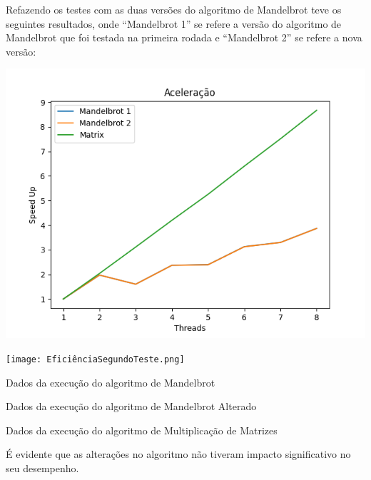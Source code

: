 \documentclass[10pt,a4paper]{article}
\begin{document}
		Refazendo os testes com as duas versões do algoritmo de Mandelbrot teve os seguintes resultados, onde ``Mandelbrot 1'' se refere
		a versão do algoritmo de Mandelbrot que foi testada na primeira rodada e ``Mandelbrot 2'' se refere a nova versão:

		\includegraphics[scale=.7]{SpeedUpSegundoTeste.png}
		
		\texttt{[image: EficiênciaSegundoTeste.png]}

		\clearpage

		\begin{table}[htb]
			\begin{adjustwidth}{-1cm}{}
				\caption{Dados da execução do algoritmo de Mandelbrot}
			\end{adjustwidth}
		\end{table}
		\begin{table}[htb]
			\begin{adjustwidth}{-1cm}{}
				\caption{Dados da execução do algoritmo de Mandelbrot Alterado}
			\end{adjustwidth}
		\end{table}
		\begin{table}[htb]
			\begin{adjustwidth}{-1cm}{}
				\caption{Dados da execução do algoritmo de Multiplicação de Matrizes}
			\end{adjustwidth}
		\end{table}

		É evidente que as alterações no algoritmo não tiveram impacto significativo no seu desempenho.
\end{document}
